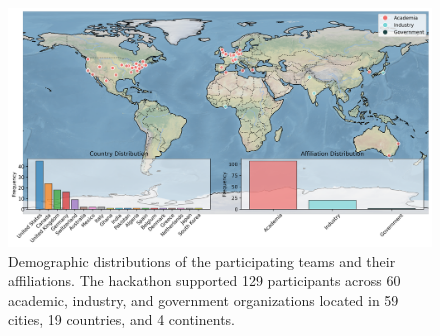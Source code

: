 \documentclass[superscriptaddress, nofootinbib,  amsmath, amssymb, twocolumn]{revtex4-2} %
\begin{document}
\begin{figure}
    \centering
    \includegraphics[width=0.95\linewidth]{latex/figures/world_map.png}
    \caption{Demographic distributions of the participating teams and their affiliations. The hackathon supported 129 participants across 60 academic, industry, and government organizations located in 59 cities, 19 countries, and 4 continents. \label{fig:map} }
\end{figure}






\end{document}
